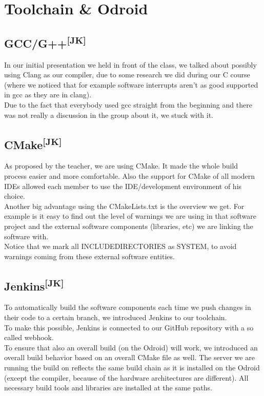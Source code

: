 \chapter{Toolchain \& Odroid}
\hypertarget{totgt}{}
\label{tolbl}
\section[GCC/G++]{GCC/G++\textsuperscript{[JK]}}
In our initial presentation we held in front of the class, we talked about
possibly using Clang as our compiler, due to some research we did during our C
course (where we noticed that for example software interrupts aren't as good
supported in gcc as they are in clang).\\
Due to the fact that everybody used gcc straight from the beginning and there
was not really a discussion in the group about it, we stuck with it.

\section[CMake]{CMake\textsuperscript{[JK]}}
As proposed by the teacher, we are using CMake. It made the whole build process
easier and more comfortable. Also the support for CMake of all modern IDEs
allowed each member to use the IDE/development environment of his choice.\\
Another big advantage using the CMakeLists.txt is the overview we get. For
example is it easy to find out the level of warnings we are using in that
software project and the external software components (libraries, etc) we are
linking the software with.\\
Notice that we mark all INCLUDE\textunderscore DIRECTORIES as SYSTEM, to avoid
warnings coming from these external software entities.

\section[Jenkins]{Jenkins\textsuperscript{[JK]}}
To automatically build the software components each time we push changes in
their code to a certain branch, we introduced Jenkins to our toolchain.\\
To make this possible, Jenkins is connected to our GitHub repository with a so
called webhook.\\
To ensure that also an overall build (on the Odroid) will work, we introduced an
overall build behavior based on an overall CMake file as well. The server we are
running the build on reflects the same build chain as it is installed on the
Odroid (except the compiler, because of the hardware architectures are
different). All necessary build tools and libraries are installed at the same
paths.

